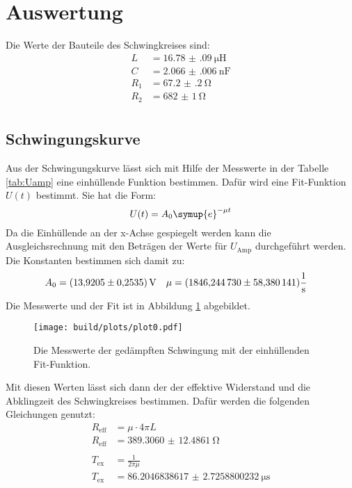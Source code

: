 \newpage
\section{Auswertung}
Die Werte der Bauteile des Schwingkreises sind:
\begin{align*}
    L&=\SI{16.78(09)}{\micro\henry}\\
    C&=\SI{2.066(006)}{\nano\farad}\\
    R_1&=\SI{67.2(2)}{\ohm}\\
    R_2&=\SI{682(1)}{\ohm}\\
\end{align*}

\subsection{Schwingungskurve}
\noindent
Aus der Schwingungskurve lässt sich mit Hilfe der Messwerte in der Tabelle \ref{tab:Uamp} eine einhüllende Funktion bestimmen. 
Dafür wird eine Fit-Funktion $U(t)$ bestimmt. Sie hat die Form:
\begin{equation}
    U(t)=A_0 \symup{e}^{-\mu t} \nonumber
\end{equation}
Da die Einhüllende an der x-Achse gespiegelt werden kann die Ausgleichsrechnung mit den Beträgen der Werte für 
$U_\text{Amp}$ durchgeführt werden. Die Konstanten bestimmen sich damit zu:
\begin{align*}
    A_0&=\SI{13.9205(2535)}{\V} & \mu&=(\num{1846.24473 \pm 58.380141 }) \mathrm{\frac{1}{s}} 
\end{align*}
Die Messwerte und der Fit ist in Abbildung \ref{img:huell} abgebildet.
\begin{figure}[H]
    \centering
    \texttt{[image: build/plots/plot0.pdf]}
    \caption{Die Messwerte der gedämpften Schwingung mit der einhüllenden Fit-Funktion.}
    \label{img:huell}
\end{figure}
\noindent
Mit diesen Werten lässt sich dann der der effektive Widerstand und die Abklingzeit des Schwingkreises bestimmen. 
Dafür werden die folgenden Gleichungen genutzt:
\begin{align*}
    R_\text{eff}&=\mu \cdot 4\pi L\\
    R_\text{eff}&= \SI{389.3060(124861)}{\ohm}  \\\\
    T_\text{ex}&=\frac{1}{2\pi\mu}\\
    T_\text{ex}&=\SI{86.2046838617(27258800232)}{\micro\second}
\end{align*}
